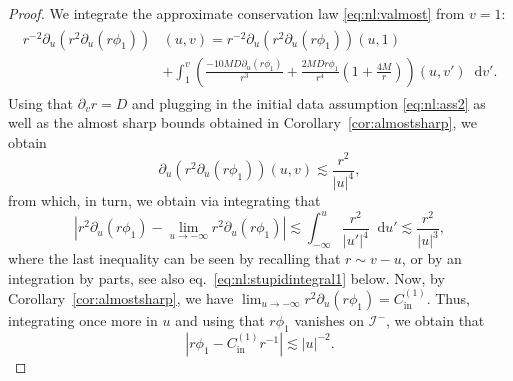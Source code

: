 \documentclass[11pt,english]{article}
\numberwithin{equation}{section}
\theoremstyle{remark}
\theoremstyle{plain}
\theoremstyle{remark}
\newcommand{\dd}{\mathop{}\!\mathrm{d}}
\newcommand{\pu}{\partial_u}
\newcommand{\pv}{\partial_v}
\renewcommand{\(}{\left(}
\renewcommand{\)}{\right)}
\newcommand{\cc}{C_{\mathrm{in}}^{(1)}}
\newcommand{\pho}{(r\phi_1)}
\begin{document}
\begin{proof}
We integrate the approximate conservation law \eqref{eq:nl:valmost} from $v=1$:
\begin{align}\label{eq:nl:proof1}
	\begin{split}
	r^{-2}\pu(r^2\pu\pho)&(u,v)=r^{-2}\pu(r^2\pu\pho)(u,1)\\
						&+\int_1^v \left(\frac{-10MD\pu\pho}{r^3}+\frac{2MDr\phi_1}{r^4}\left(1+\frac{4M}{r}\right)\right)(u,v') \dd v'.
	\end{split}
\end{align}
Using that $\pv r=D$ and plugging in the initial data assumption \eqref{eq:nl:ass2} as well as the almost sharp bounds obtained in Corollary~\ref{cor:almostsharp}, we obtain%
\begin{equation}\label{eq:l:canc:1}
\pu(r^2\pu\pho)(u,v)\lesssim\frac{r^2}{|u|^{4}},
\end{equation}
from which, in turn, we obtain via integrating that 
\begin{equation}\label{eq:l:canc:2}
\left|r^2\pu\pho-\lim_{u\to -\infty}r^2\pu\pho\right|\lesssim\int_{-\infty}^u \frac{r^2}{|u'|^{4}}\dd u'\lesssim\frac{r^2}{|u|^{3}},
\end{equation}
where the last inequality can be seen by recalling that $r\sim v-u$, or by an integration by parts, see also eq.\ \eqref{eq:nl:stupidintegral1} below. Now, by Corollary~\ref{cor:almostsharp},  we have
$
\lim_{u\to -\infty}r^2\pu\pho=\cc.
$
Thus, integrating once more in $u$ and using that $r\phi_1$ vanishes on $\mathcal{I}^-$, we obtain that
\begin{equation*}
\left|r\phi_1-\cc r^{-1}\right|\lesssim |u|^{-2}.
\end{equation*}


\end{proof}
\end{document}
